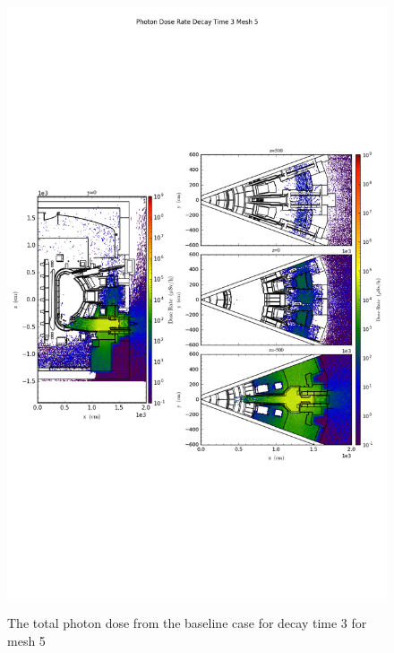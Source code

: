 \begin{figure}[ht!]
\centering
\includegraphics[trim={0cm 9cm 0cm 10cm},clip,scale=0.75]{../plots/final_model_nob4c/Photon_Dose_Rate_Decay_Time_3_Mesh_5.png}
\label{fig:photons_dc3_no4bc_m5_flux}
\caption{The total photon dose from the baseline case for decay time 3 for mesh 5}
\end{figure}
